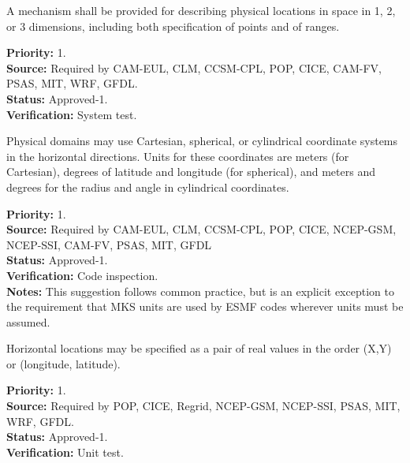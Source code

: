 

A mechanism shall be provided for describing physical locations in space in 1,
2, or 3 dimensions, including both specification of points and of ranges.
\begin{reqlist}
{\bf Priority:} 1. \\
{\bf Source:} Required by CAM-EUL, CLM, CCSM-CPL, POP, CICE, 
              CAM-FV, PSAS, MIT, WRF, GFDL. \\
{\bf Status:} Approved-1. \\
{\bf Verification:} System test.
\end{reqlist}



Physical domains may use Cartesian, spherical, or cylindrical coordinate
systems in the horizontal directions.  Units for these coordinates are meters
(for Cartesian), degrees of latitude and longitude (for spherical), and meters
and degrees for the radius and angle in cylindrical coordinates.

\begin{reqlist}
{\bf Priority:} 1. \\
{\bf Source:} Required by CAM-EUL, CLM, CCSM-CPL, POP, CICE, NCEP-GSM, NCEP-SSI, CAM-FV, PSAS, MIT, GFDL \\
{\bf Status:} Approved-1. \\
{\bf Verification:} Code inspection.\\
{\bf Notes:}  This suggestion follows common practice, but is an explicit
exception to the requirement that MKS units are used by ESMF codes wherever
units must be assumed.
\end{reqlist}


Horizontal locations may be specified as a pair of real values in the order
(X,Y) or (longitude, latitude).
\begin{reqlist}
{\bf Priority:} 1. \\
{\bf Source:} Required by POP, CICE, Regrid, NCEP-GSM, NCEP-SSI,
              PSAS, MIT, WRF, GFDL. \\
{\bf Status:} Approved-1. \\
{\bf Verification:} Unit test.
\end{reqlist}



